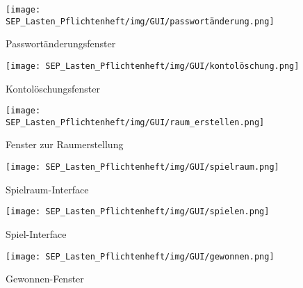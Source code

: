 \begin{figure}
	\centering
	\texttt{[image: SEP\_Lasten\_Pflichtenheft/img/GUI/passwortänderung.png]}
	\caption{Passwortänderungsfenster}
	\label{gui:passwort}
\end{figure}

\begin{figure}
	\centering
	\texttt{[image: SEP\_Lasten\_Pflichtenheft/img/GUI/kontolöschung.png]}
	\caption{Kontolöschungsfenster}
	\label{gui:konto}
\end{figure}

\begin{figure}
	\centering
	\texttt{[image: SEP\_Lasten\_Pflichtenheft/img/GUI/raum\_erstellen.png]}
	\caption{Fenster zur Raumerstellung}
	\label{gui:erstellen}
\end{figure}

\begin{figure}
	\centering
	\texttt{[image: SEP\_Lasten\_Pflichtenheft/img/GUI/spielraum.png]}
	\caption{Spielraum-Interface}
	\label{gui:raum}
\end{figure}

\begin{figure}
	\centering
	\texttt{[image: SEP\_Lasten\_Pflichtenheft/img/GUI/spielen.png]}
	\caption{Spiel-Interface}
	\label{gui:spiel}
\end{figure}

\begin{figure}
	\centering
	\texttt{[image: SEP\_Lasten\_Pflichtenheft/img/GUI/gewonnen.png]}
	\caption{Gewonnen-Fenster}
	\label{gui:win}
\end{figure}